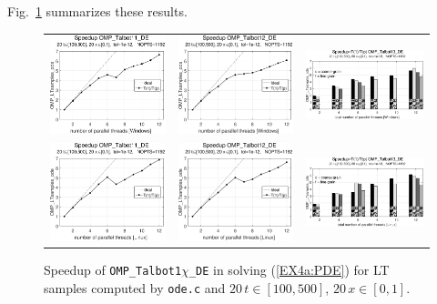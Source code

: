 \documentclass[a4paper,10pt]{report}%
\begin{document}
Fig.~\ref{PAR_EX4a_speedup_ode2} summarizes these results.
\begin{figure}[htb]
\centering
\begin{tabular}{ccc}%
\includegraphics[height=0.2\textwidth]{./FIGS/EX4a/EX4a_ode_speedup_11_20t_100_Windows.eps} &
\includegraphics[height=0.2\textwidth]{./FIGS/EX4a/EX4a_ode_speedup_12_20t_100_Windows.eps} &
\includegraphics[height=0.2\textwidth,keepaspectratio=true]{./FIGS/EX4a/EX4a_ode_speedup_13_20t_100_Windows.eps} \\
\includegraphics[height=0.2\textwidth]{./FIGS/EX4a/EX4a_ode_speedup_11_20t_100_Linux.eps} &
\includegraphics[height=0.2\textwidth]{./FIGS/EX4a/EX4a_ode_speedup_12_20t_100_Linux.eps} &
\includegraphics[height=0.2\textwidth,keepaspectratio=true]{./FIGS/EX4a/EX4a_ode_speedup_13_20t_100_Linux.eps}
\end{tabular}
\caption{\small Speedup of {\tt OMP\_Talbot1$\chi$\_DE} in solving (\ref{EX4a:PDE}) for LT samples
computed by {\tt ode.c} and $20\,t\in[100,500]$, $20\,x\in[0,1]$.}
\label{PAR_EX4a_speedup_ode2}
\end{figure}
\end{document}
